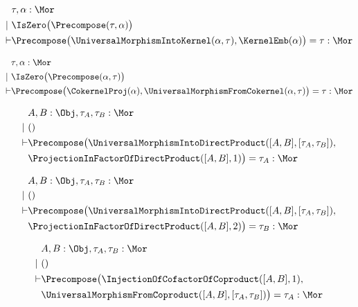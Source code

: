 \begin{sequent}
\begin{align*}
  &\tau, \alpha:\Mor\\
  |~ &\IsZero\big( \Precompose( \tau, \alpha ) \big)\\
  \vdash &\Precompose\big(\UniversalMorphismIntoKernel( \alpha , \tau ), \KernelEmb( \alpha ) \big) = \tau:\Mor
\end{align*}
\end{sequent}

\begin{sequent}
\begin{align*}
  &\tau, \alpha:\Mor\\
  |~  &\IsZero\big(\Precompose(\alpha, \tau)\big)\\
  \vdash &\Precompose\big(\CokernelProj( \alpha ), \UniversalMorphismFromCokernel( \alpha, \tau )\big) = \tau:\Mor
\end{align*}
\end{sequent}

\begin{sequent}
\begin{align*}
  &A, B:\Obj, \tau_A, \tau_B:\Mor\\
  | ~&() \\
  \vdash &\Precompose\big(\UniversalMorphismIntoDirectProduct( [A,B], [\tau_A, \tau_B] ), \\
  &\ProjectionInFactorOfDirectProduct( [A,B], 1 ) \big) = \tau_A:\Mor
\end{align*}
\end{sequent}

\begin{sequent}
\begin{align*}
&A, B:\Obj, \tau_A, \tau_B:\Mor\\
  | ~&() \\
  \vdash &\Precompose\big(\UniversalMorphismIntoDirectProduct( [A,B], [\tau_A, \tau_B] ), \\
  &\ProjectionInFactorOfDirectProduct( [A,B], 2 ) \big) = \tau_B:\Mor
\end{align*}
\end{sequent}

\begin{sequent}
\begin{align*}
  &A, B:\Obj, \tau_A, \tau_B:\Mor \\
  |~ &()\\
  \vdash &\Precompose\big(\InjectionOfCofactorOfCoproduct( [A, B], 1 ),\\
  &\UniversalMorphismFromCoproduct( [A,B], [\tau_A, \tau_B] ) \big) = \tau_A:\Mor
\end{align*}
\end{sequent}

